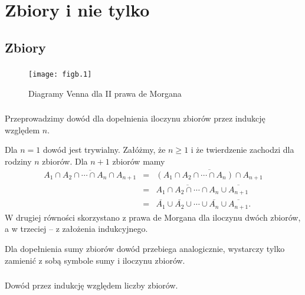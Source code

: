 \chapter{Zbiory i nie tylko}

\section{Zbiory}

\subsection{} %
\begin{figure}[h]
	\begin{center}
		\texttt{[image: figb.1]}
	\end{center}
	\caption{Diagramy Venna dla II prawa de Morgana}
\end{figure}

\subsection{} %
Przeprowadzimy dowód dla dopełnienia iloczynu zbiorów przez indukcję względem $n$.

Dla $n=1$ dowód jest trywialny. Załóżmy, że $n\ge1$ i że twierdzenie zachodzi dla rodziny $n$ zbiorów. Dla $n+1$ zbiorów mamy
\begin{eqnarray*}
	\overline{A_1\cap A_2\cap\cdots\cap A_n\cap A_{n+1}} &=& \overline{(A_1\cap A_2\cap\cdots\cap A_n)\cap A_{n+1}} \\
	&=& \overline{A_1\cap A_2\cap\cdots\cap A_n}\cup\overline{A_{n+1}} \\
	&=& \overline{A_1}\cup\overline{A_2}\cup\cdots\cup\overline{A_n}\cup\overline{A_{n+1}}.
\end{eqnarray*}
W drugiej równości skorzystano z prawa de Morgana dla iloczynu dwóch zbiorów, a w trzeciej -- z założenia indukcyjnego.

Dla dopełnienia sumy zbiorów dowód przebiega analogicznie, wystarczy tylko zamienić z sobą symbole sumy i iloczynu zbiorów.

\subsection{} %
Dowód przez indukcję względem liczby zbiorów.

